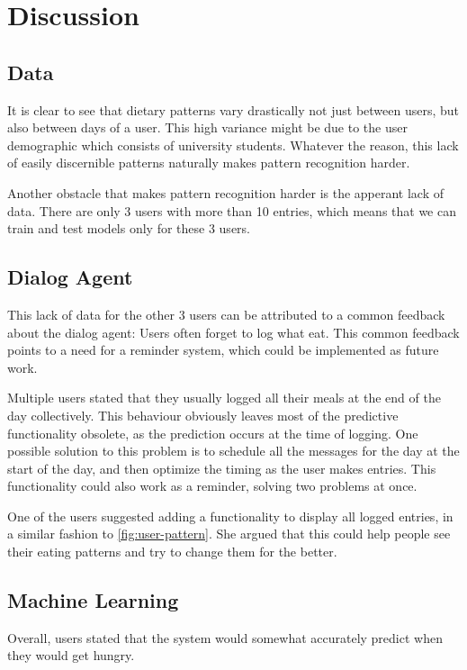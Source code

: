
\chapter{Discussion}\label{chapter:discussion}

\section{Data}
It is clear to see that dietary patterns vary drastically not just between users, but also between days of a user.
This high variance might be due to the user demographic which consists of university students.
Whatever the reason, this lack of easily discernible patterns naturally makes pattern recognition harder.

Another obstacle that makes pattern recognition harder is the apperant lack of data.
There are only 3 users with more than 10 entries, which means that we can train and test models only for these 3 users.

\section{Dialog Agent}
This lack of data for the other 3 users can be attributed to a common feedback about the dialog agent:
Users often forget to log what eat.
This common feedback points to a need for a reminder system, which could be implemented as future work.

Multiple users stated that they usually logged all their meals at the end of the day collectively.
This behaviour obviously leaves most of the predictive functionality obsolete, as the prediction occurs at the time of logging.
One possible solution to this problem is to schedule all the messages for the day at the start of the day, and then optimize the timing as the user makes entries.
This functionality could also work as a reminder, solving two problems at once.

One of the users suggested adding a functionality to display all logged entries, in a similar fashion to \autoref{fig:user-pattern}.
She argued that this could help people see their eating patterns and try to change them for the better.

\section{Machine Learning}
Overall, users stated that the system would somewhat accurately predict when they would get hungry.

